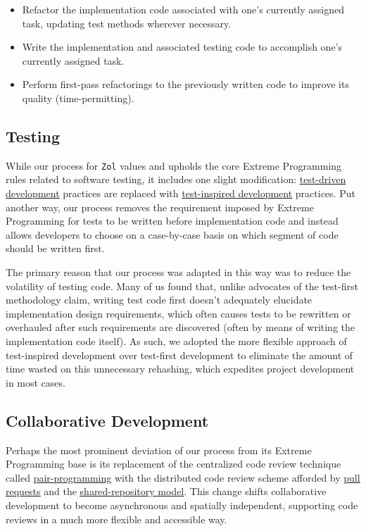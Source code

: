 \documentclass{article}
\newcommand{\projectname}[0] {\texttt{Zol} }
\begin{document}
		\begin{itemize}
			\item Refactor the implementation code associated with one's currently
			assigned task, updating test methods wherever necessary.

			\item Write the implementation and associated testing code to
			accomplish one's currently assigned task.

			\item Perform first-pass refactorings to the previously written code
			to improve its quality (time-permitting).
		\end{itemize}

		\subsection{Testing}
		While our process for \projectname values and upholds the core Extreme
		Programming rules related to software testing, it includes one slight
		modification: \href{http://en.wikipedia.org/wiki/Test-driven\_development}
        {{\color{blue}\underline{test-driven development}}} practices are replaced with
		\href{http://treyhunner.com/2013/07/test-inspired-development/}
        {{\color{blue}\underline{test-inspired development}}} practices.  Put another way, our process
		removes the requirement imposed by Extreme Programming for tests to be
		written before implementation code and instead allows developers to
		choose on a case-by-case basis on which segment of code should be
		written first.

		The primary reason that our process was adapted in this way was to
		reduce the volatility of testing code.  Many of us found that, unlike
		advocates of the test-first methodology claim, writing test code first
		doesn't adequately elucidate implementation design requirements, which
		often causes tests to be rewritten or overhauled after such requirements
		are discovered (often by means of writing the implementation code itself).
		As such, we adopted the more flexible approach of test-inspired
		development over test-first development to eliminate the amount of time
		wasted on this unnecessary rehashing, which expedites project development
		in most cases.

		\subsection{Collaborative Development}
		Perhaps the most prominent deviation of our process from its Extreme
		Programming base is its replacement of the centralized code review
		technique called \href{http://www.extremeprogramming.org/rules/pair.html}
        {{\color{blue}\underline{pair-programming}}} with the distributed code review scheme afforded
		by \href{https://www.atlassian.com/git/workflows#!pull-request}
        {{\color{blue}\underline{pull requests}}} and the \href{https://help.github.com/articles/using-pull-requests#shared-repository-model}
        {{\color{blue}\underline{shared-repository model}}}.  This change shifts collaborative
		development to become asynchronous and spatially independent, supporting
		code reviews in a much more flexible and accessible way.
\end{document}
